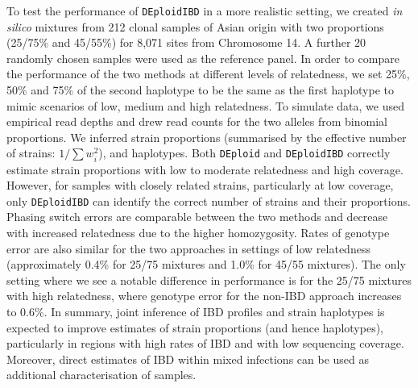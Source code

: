 \documentclass[9pt,lineno]{elife}
\begin{document}
To test the performance of \texttt{DEploidIBD} in a more realistic setting, we created {\it in silico} mixtures from 212 clonal samples of Asian origin with two proportions (25/75\% and 45/55\%) for 8,071 sites from Chromosome 14.  A further 20 randomly chosen samples were used as the reference panel. In order to compare the performance of the two methods at different levels of relatedness, we set 25\%, 50\% and 75\% of the second haplotype to be the same as the first haplotype to mimic scenarios of low, medium and high relatedness. To simulate data, we used empirical read depths and drew read counts for the two alleles from binomial proportions.  We inferred strain proportions (summarised by the effective number of strains: $1/\sum w_{i}^{2}$), and haplotypes.  Both \texttt{DEploid} and \texttt{DEploidIBD} correctly estimate strain proportions with low to moderate relatedness and high coverage.  However, for samples with closely related strains, particularly at low coverage, only \texttt{DEploidIBD} can identify the correct number of strains and their proportions.  Phasing switch errors are comparable between the two methods and decrease with increased relatedness due to the higher homozygosity.  Rates of genotype error are also similar for the two approaches in settings of low relatedness (approximately 0.4\% for 25/75 mixtures and 1.0\% for 45/55 mixtures).  The only setting where we see a notable difference in performance is for the 25/75 mixtures with high relatedness, where genotype error for the non-IBD approach increases to 0.6\%.  In summary, joint inference of IBD profiles and strain haplotypes is expected to improve estimates of strain proportions (and hence haplotypes), particularly in regions with high rates of IBD and with low sequencing coverage.  Moreover, direct estimates of IBD within mixed infections can be used as additional characterisation of samples.
\end{document}
